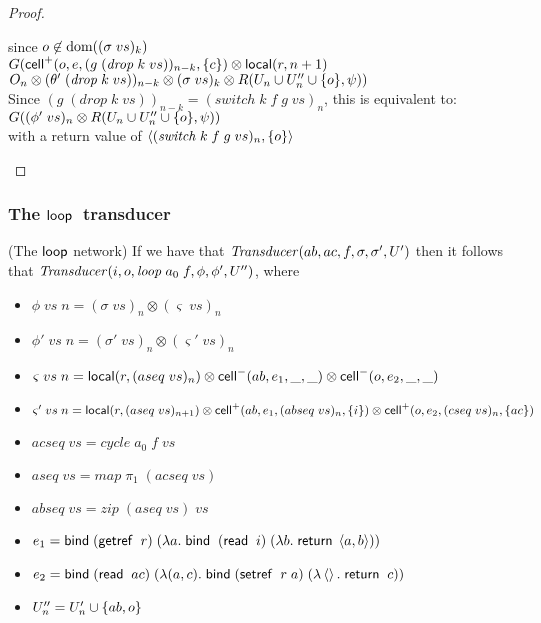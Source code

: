 \begin{proof}
\begin{enumerate}
\begin{tabbedproof}
  \ooooo since $o \not\in \mbox{dom}({(\sigma\;vs)_k})$ \\
  \ooooo $G(\mathsf{cell}^{+}({o}, {e}, {(g\;(\mathit{drop}\;k\;vs))_{n-k}}, {\{{c}\}}) \otimes \mathsf{local}({r}, {n+1})$ \\
  \oooooo $O_n \otimes (\theta'\;(\mathit{drop}\;k\;vs))_{n-k} \otimes (\sigma\;vs)_k \otimes R(U_n \cup U''_n \cup \{{o}\}, \psi))$ \\ 
  \oooo Since $(g\;(\mathit{drop}\;k\;vs))_{n-k} = (\mathit{switch}\;k\;f\;g\;vs)_n$, this is equivalent to:\\
  \ooooo $G((\phi'\;vs)_n \otimes R(U_n \cup U''_n \cup \{{o}\}, \psi))$ \\
  \oooo with a return value of $\left<{(\mathit{switch}\;k\;f\;g\;vs)_n},{\{{o}\}}\right>$ \\ 
  \end{tabbedproof}
\end{enumerate}
\end{proof}



\subsubsection{The $\mathsf{loop}\;$ transducer}
\begin{lemma}{(The $\mathsf{loop}$ network)}
If we have that $\mathit{Transducer}(ab, ac, f, \sigma, \sigma', U')$ 
then it follows that $\mathit{Transducer}(i, o, \mathit{loop}\;a_0\;f, \phi, \phi', U'')$, where 

\begin{itemize}
\item $\phi\;vs\;n = (\sigma\;vs)_n \otimes (\varsigma\;vs)_n $
\item $\phi'\;vs\;n = (\sigma'\;vs)_n \otimes (\varsigma'\;vs)_n$
\item $\varsigma\;vs\;n = \mathsf{local}({r}, {(aseq\;vs)_n}) \otimes \mathsf{cell}^{-}({ab}, {e_1}, {\_}, {\_}) \otimes \mathsf{cell}^{-}({o}, {e_2}, {\_}, {\_})$ 
\item $\varsigma'\;vs\;n = {\small \mathsf{local}({r}, {(aseq\;vs)_{n+1}}) \otimes \mathsf{cell}^{+}({ab}, {e_1}, {(abseq\;vs)_n}, {\{{i}\}}) \otimes \mathsf{cell}^{+}({o}, {e_2}, {(cseq\;vs)_n}, {\{{ac}\}})}$ 
\item $acseq\;vs = \mathit{cycle}\;a_0\;f\;vs$
\item $aseq\;vs = \mathit{map}\;\pi_1\;(acseq\;vs)$
\item $abseq\;vs = \mathit{zip}\;(aseq\;vs)\;vs$
\item $e_1 = \mathsf{bind}\; (\mathsf{getref}\;\;r)\;(\lambda a.\;\mathsf{bind}\;\;(\mathsf{read}\;\;i)\; (\lambda b.\;\mathsf{return}\;\left<{a},{b}\right>))$
\item $e_2 = \mathsf{bind}\; (\mathsf{read}\;\;ac)\;(\lambda (a,c).\;\mathsf{bind}\; (\mathsf{setref}\;\;r\;a)\; (\lambda \left<\right>.\;\mathsf{return}\;\;c))$
\item $U''_n = U'_n \cup \{{ab,o}\}$
\end{itemize}
\end{lemma}

